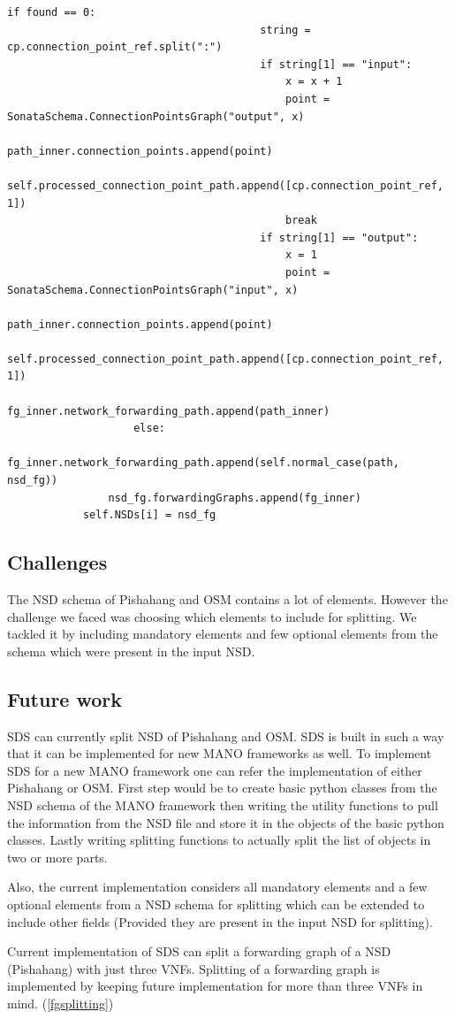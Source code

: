 \begin{lstlisting}[caption=Forwarding Graph Splitting, label=lis:FGSplitting]
                                    if found == 0:
                                        string = cp.connection_point_ref.split(":")
                                        if string[1] == "input":
                                            x = x + 1
                                            point = SonataSchema.ConnectionPointsGraph("output", x)
                                            path_inner.connection_points.append(point)
                                            self.processed_connection_point_path.append([cp.connection_point_ref, 1])
                                            break
                                        if string[1] == "output":
                                            x = 1
                                            point = SonataSchema.ConnectionPointsGraph("input", x)
                                            path_inner.connection_points.append(point)
                                            self.processed_connection_point_path.append([cp.connection_point_ref, 1])
                            fg_inner.network_forwarding_path.append(path_inner)
                    else:
                        fg_inner.network_forwarding_path.append(self.normal_case(path, nsd_fg))
                nsd_fg.forwardingGraphs.append(fg_inner)
            self.NSDs[i] = nsd_fg

\end{lstlisting}

\subsection{Challenges}
The NSD schema of Pishahang and OSM contains a lot of elements. However the challenge we faced was choosing which elements to include for splitting. We tackled it by including mandatory elements and few optional elements from the schema which were present in the input NSD.
\subsection{Future work}
SDS can currently split NSD of Pishahang and OSM. SDS is built in such a way that it can be implemented for new MANO frameworks as well. To implement SDS for a new MANO framework one can refer the implementation of either Pishahang or OSM. First step would be to create basic python classes from the NSD schema of the MANO framework then writing the utility functions to pull the information from the NSD file and store it in the objects of the basic python classes. Lastly writing splitting functions to actually split the list of objects in two or more parts.

Also, the current implementation considers all mandatory elements and a few optional elements from a NSD schema for splitting which can be extended to include other fields (Provided they are present in the input NSD for splitting).

Current implementation of SDS can split a forwarding graph of a NSD (Pishahang) with just three VNFs. Splitting of a forwarding graph is implemented by keeping future implementation for more than three VNFs in mind. (\ref{fgsplitting})
